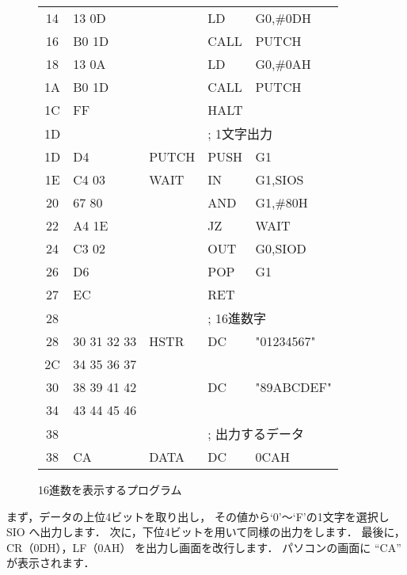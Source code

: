 \begin{figure}[btp]
{\begin{center}
\begin{tabular}{|c|l|l|l l |}
14 & 13 0D         &        & LD     & G0,\#0DH            \\
16 & B0 1D         &        & CALL   & PUTCH               \\
18 & 13 0A         &        & LD     & G0,\#0AH            \\
1A & B0 1D         &        & CALL   & PUTCH               \\
1C & FF            &        & HALT   &                     \\
1D &               &        & \multicolumn{2}{l|}{; 1文字出力} \\
1D & D4            & PUTCH  & PUSH   & G1                  \\
1E & C4 03         & WAIT   & IN     & G1,SIOS             \\
20 & 67 80         &        & AND    & G1,\#80H            \\
22 & A4 1E         &        & JZ     & WAIT                \\
24 & C3 02         &        & OUT    & G0,SIOD             \\
26 & D6            &        & POP    & G1                  \\
27 & EC            &        & RET    &                     \\
28 &               &        & \multicolumn{2}{l|}{; 16進数字} \\
28 & 30 31 32 33   & HSTR   & DC     & "01234567"          \\
2C & 34 35 36 37   &        &        &                     \\
30 & 38 39 41 42   &        & DC     & "89ABCDEF"          \\
34 & 43 44 45 46   &        &        &                      \\
38 &               &        & \multicolumn{2}{l|}{; 出力するデータ} \\
38 & CA            & DATA   & DC     & 0CAH                \\
\hline
\end{tabular}
\end{center}}
\caption{16進数を表示するプログラム}
\label{fig:chap6:hex}
\end{figure}

まず，データの上位4ビットを取り出し，
その値から`0'〜`F'の1文字を選択し SIO へ出力します．
次に，下位4ビットを用いて同様の出力をします．
最後に，
CR（0DH），LF（0AH） を出力し画面を改行します．
パソコンの画面に ``CA'' が表示されます．

